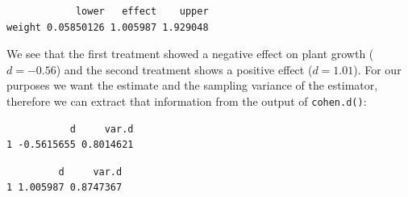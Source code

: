 \documentclass[
  letterpaper,
  DIV=11,
  numbers=noendperiod]{scrreprt}
\newenvironment{Shaded}{}{}
\newcommand{\AttributeTok}[1]{\textcolor[rgb]{0.00,0.34,0.68}{#1}}
\newcommand{\CommentTok}[1]{\textcolor[rgb]{0.54,0.53,0.53}{#1}}
\newcommand{\DecValTok}[1]{\textcolor[rgb]{0.69,0.50,0.00}{#1}}
\newcommand{\FunctionTok}[1]{\textcolor[rgb]{0.39,0.29,0.61}{#1}}
\newcommand{\NormalTok}[1]{\textcolor[rgb]{0.12,0.11,0.11}{#1}}
\newcommand{\OtherTok}[1]{\textcolor[rgb]{0.00,0.43,0.16}{#1}}
\newcommand{\SpecialCharTok}[1]{\textcolor[rgb]{0.24,0.68,0.91}{#1}}
\newcommand{\StringTok}[1]{\textcolor[rgb]{0.75,0.01,0.01}{#1}}
\begin{document}
\begin{tcolorbox}
\begin{Shaded}
\end{Shaded}

\begin{verbatim}
            lower   effect    upper
weight 0.05850126 1.005987 1.929048
\end{verbatim}

We see that the first treatment showed a negative effect on plant growth
(\(d=-0.56\)) and the second treatment shows a positive effect
(\(d=1.01\)). For our purposes we want the estimate and the sampling
variance of the estimator, therefore we can extract that information
from the output of \texttt{cohen.d()}:

\begin{Shaded}
\end{Shaded}

\begin{verbatim}
           d     var.d
1 -0.5615655 0.8014621
\end{verbatim}

\begin{Shaded}
\end{Shaded}

\begin{verbatim}
         d     var.d
1 1.005987 0.8747367
\end{verbatim}

\end{tcolorbox}
\end{document}
